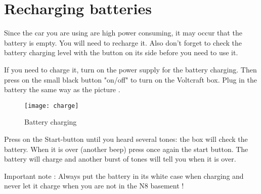 \section{Recharging batteries}
\label{sec:advanced_recharge}

Since the car you are using are high power consuming, it may occur that the battery is empty. You will need to recharge it. Also don't forget to check the battery charging level with the button on its side before you need to use it.

If you need to charge it, turn on the power supply for the battery charging. Then press on the small black button "on/off" to turn on the Voltcraft box. Plug in the battery the same way as the picture  .

\begin{figure}[htbp]
	\centering
		\texttt{[image: charge]}
	\caption{Battery charging}
	\label{fig:adv_charge}
\end{figure}

Press on the Start-button until you heard several tones: the box will check the battery. When it is over (another beep) press once again the start button. The battery will charge and another burst of tones will tell you when it is over.

Important note : Always put the battery in its white case when charging and never let it charge when you are not in the N8 basement !



